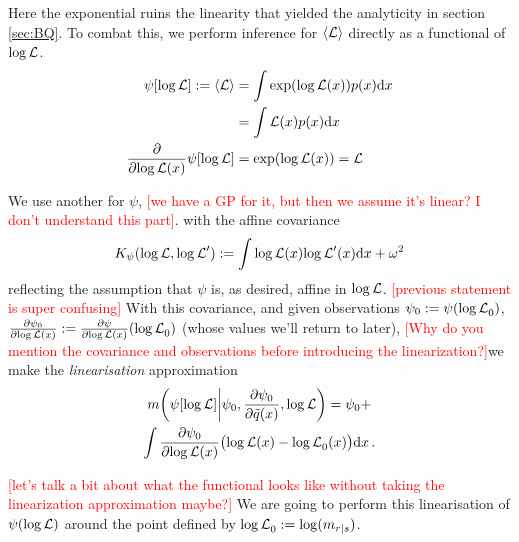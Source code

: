 \documentclass{article}
\begin{document}
Here the exponential ruins the linearity that yielded the analyticity in section \ref{sec:BQ}. To combat this, we perform inference for $\inty{\lfn}$ directly as a functional of $\tr$.
%
\begin{align}
 \psi[\tr] \deq \inty{\lfn} & = \int \exp ( \tr(\lfv)) p(\lfv) \ud \lfv\\
  						    & = \int \lfn(\lfv) p(\lfv) \ud \lfv\\
\pderiv{}{\tr(\lfv)}\psi[\tr] & = \exp (\tr(\lfv)) = \lfn
\end{align}

We use another \gpb for $\psi$, \textcolor{red}{[we have a GP for it, but then we assume it's linear? I don't understand this part]}. with the affine covariance
\begin{equation*}
 K_\psi(\tr,\tr')
\deq
\int\tr(\lfv) \tr'(\lfv) \ud \lfv
+ \omega^2
\end{equation*}
reflecting the assumption that $\psi$ is, as desired, affine in $\tr$. \textcolor{red}{[previous statement is super confusing]} With this covariance, and given observations
$\psi_0 \deq \psi(\tr_0)$, $\pderiv{\psi_0}{\tr(\lfv)} \deq \pderiv{\psi}{\tr(\lfv)}(\tr_0)$ (whose values we'll return to later), \textcolor{red}{[Why do you mention the covariance and observations before introducing the linearization?]}we make the \emph{linearisation} approximation
\begin{multline}\label{eq:linearisation}
\novmean{\psi[\tr]}{\psi_0,\pderiv{\psi_0}{\tq(\lfv)}, \tr} 
= \psi_0+\\
\int \pderiv{\psi_0}{\tr(\lfv)}\bigl(\tr(\lfv)-\tr_0(\lfv)\bigr)\ud\lfv\,.
\end{multline}

\textcolor{red}{[let's talk a bit about what the functional looks like without taking the linearization approximation maybe?]}
We are going to perform this linearisation of $\psi(\tr)$ around the point defined by $\tr_0 \deq \log (m_{r|s})$.
\end{document}
